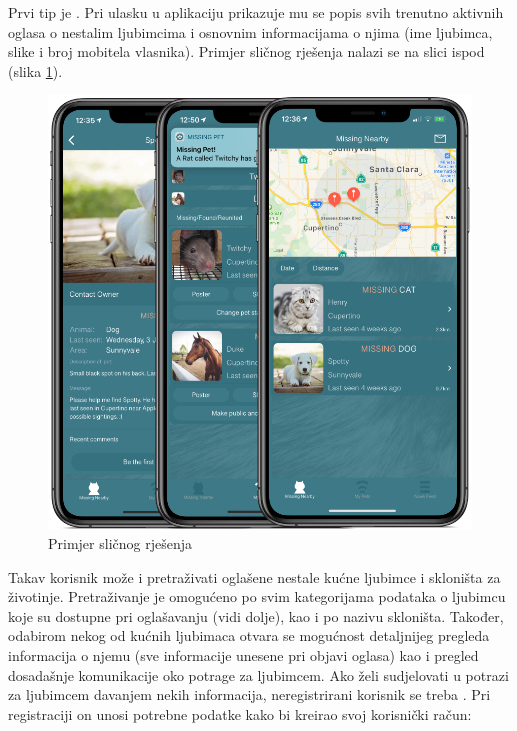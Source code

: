		Prvi tip je . Pri ulasku u aplikaciju prikazuje mu se popis svih trenutno aktivnih oglasa o nestalim ljubimcima i osnovnim informacijama o njima (ime ljubimca, slike i broj mobitela vlasnika). Primjer sličnog rješenja nalazi se na slici ispod (slika \ref{fig:slika1}).

		\begin{figure}[H]
			\includegraphics[scale=0.4]{slike/ljubimci.PNG} %
			\centering
			\caption{Primjer sličnog rješenja}
			\label{fig:slika1}
		\end{figure}

		Takav korisnik može i pretraživati oglašene nestale kućne ljubimce i skloništa za životinje. Pretraživanje je omogućeno po svim kategorijama podataka o ljubimcu koje su dostupne pri oglašavanju (vidi dolje), kao i po nazivu skloništa. Također, odabirom nekog od kućnih ljubimaca otvara se mogućnost detaljnijeg pregleda informacija o njemu (sve informacije unesene pri objavi oglasa) kao i pregled dosadašnje komunikacije oko potrage za ljubimcem.
Ako želi sudjelovati u potrazi za ljubimcem davanjem nekih informacija, neregistrirani korisnik se treba . Pri registraciji on unosi potrebne podatke kako bi kreirao svoj korisnički račun:

